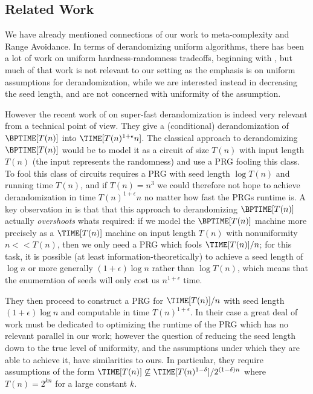\subsection{Related Work}

We have already mentioned connections of our work to meta-complexity and Range Avoidance. In terms of derandomizing uniform algorithms, there has been a lot of work on uniform hardness-randomness tradeoffs, beginning with \cite{IW98}, but much of that work is not relevant to our setting as the emphasis is on uniform assumptions for derandomization, while we are interested instead in decreasing the seed length, and are not concerned with uniformity of the assumption. 

However the recent work of \cite{CT21a} on super-fast derandomization is indeed very relevant from a technical point of view.
They give a (conditional) derandomization of $\BPTIME[T(n)]$ into $\TIME[T(n)^{1 + \epsilon} n]$. The classical approach to derandomizing $\BPTIME[T(n)]$ would be to model it as a circuit of size $T(n)$ with input length $T(n)$ (the input represents the randomness) and use a PRG fooling this class. To fool this class of circuits requires a PRG with seed length $\log T(n)$ and running time $T(n)$, and if $T(n) = n^3$ we could therefore not hope to achieve derandomization in time $T(n)^{1+\epsilon} n$ no matter how fast the PRGs runtime is. A key observation in \cite{CT21a} is that that this approach to derandomizing $\BPTIME[T(n)]$ actually \emph{overshoots} whats required: if we model the $\BPTIME[T(n)]$ machine more precisely as a $\TIME[T(n)]$ machine on input length $T(n)$ with nonuniformity $n << T(n)$, then we only need a PRG which fools $\TIME[T(n)]/n$; for this task, it is possible (at least information-theoretically) to achieve a seed length of $\log n$ or more generally $(1 + \epsilon)\log n$ rather than $\log T(n)$, which means that the enumeration of seeds will only cost us $n^{1 + \epsilon}$ time.

They then proceed to construct a PRG for $\TIME[T(n)]/n$ with seed length $(1 + \epsilon) \log n$ and computable in time $T(n)^{1 + \epsilon}$. In their case a great deal of work must be dedicated to optimizing the runtime of the PRG which has no relevant parallel in our work; however the question of reducing the seed length down to the true level of uniformity, and the assumptions under which they are able to achieve it, have similarities to ours. In particular, they require assumptions of the form $\TIME[T(n)] \not\subseteq \TIME[T(n)^{1- \delta}]/2^{(1-\delta)n}$ where $T(n) = 2^{k n}$ for a large constant $k$.

